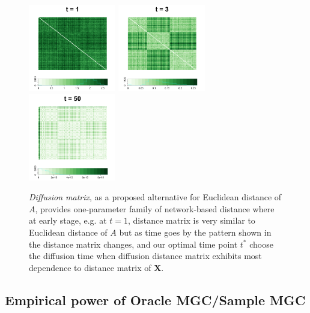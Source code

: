 \documentclass[12pt]{article}
\begin{document}
\begin{figure}[H]
	\centering
	\includegraphics[width=1.5in]{../Figure/Dx1.png}
	\includegraphics[width=1.5in]{../Figure/Dx3.png}
	\includegraphics[width=1.5in]{../Figure/Dx50.png}
	\label{fig:diffusions}
	\caption{\textit{Diffusion matrix}, as a proposed alternative for Euclidean distance of $A$, provides one-parameter family of network-based distance where at early stage, e.g. at $t=1$, distance matrix is very similar to Euclidean distance of $A$ but as time goes by the pattern shown in the distance matrix changes, and our optimal time point $t^{*}$ choose the diffusion time when diffusion distance matrix exhibits most dependence to distance matrix of $\mathbf{X}$.}
\end{figure}	


\subsection*{ Empirical power of Oracle MGC/Sample MGC}
\end{document}
